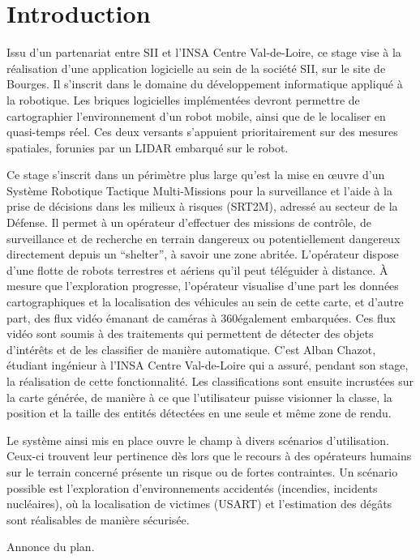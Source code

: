 \chapter*{Introduction}
Issu d’un partenariat entre \gls{SII} et l’INSA Centre Val-de-Loire, ce stage vise à la réalisation d’une application logicielle au sein de la société SII, sur le site de Bourges. 
Il s’inscrit dans le domaine du développement informatique appliqué à la robotique. 
Les briques logicielles implémentées devront permettre de cartographier l’environnement d’un robot mobile, ainsi que de le localiser en quasi-temps réel. 
Ces deux versants s’appuient prioritairement sur des mesures spatiales, forunies par un \gls{LIDAR} embarqué sur le robot. 

Ce stage s'inscrit dans un périmètre plus large qu’est la mise en \oe{}uvre d’un Système Robotique Tactique Multi-Missions pour la surveillance et l’aide à la prise de décisions dans les milieux à risques (\gls{SRT2M}), 
adressé au secteur de la Défense. 
Il permet à un opérateur d’effectuer des missions de contrôle, de surveillance et de recherche en terrain dangereux ou potentiellement dangereux directement depuis un ``shelter'', à savoir une zone abritée. 
L’opérateur dispose d’une flotte de robots terrestres et aériens qu’il peut téléguider à distance. 
\`{A} mesure que l’exploration progresse, l’opérateur visualise d’une part les données cartographiques et la localisation des véhicules au sein de cette carte, et d’autre part, 
des flux vidéo émanant de caméras à 360\degre également embarquées. 
Ces flux vidéo sont soumis à des traitements qui permettent de détecter des objets d’intérêts et de les classifier de manière automatique. 
C'est Alban Chazot, étudiant ingénieur à l'INSA Centre Val-de-Loire qui a assuré, pendant son stage, la réalisation de cette fonctionnalité.   
Les classifications sont ensuite incrustées sur la carte générée, de manière à ce que l'utilisateur puisse visionner la classe, la position et la taille des entités détectées en une seule et même zone de rendu. 

Le système ainsi mis en place ouvre le champ à divers scénarios d’utilisation. 
Ceux-ci trouvent leur pertinence dès lors que le recours à des opérateurs humains sur le terrain concerné présente un risque ou de fortes contraintes. 
Un scénario possible est l’exploration d’environnements accidentés (incendies, incidents nucléaires), où la localisation de victimes (USART) et l’estimation des dégâts sont réalisables de manière sécurisée. 

Annonce du plan. 